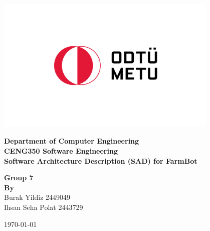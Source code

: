\begin{titlepage}
   \begin{center}

       \includegraphics[width=0.8\textwidth]{Figures/metu_logo.png}
       \vspace{0.0cm}
     
            
        \textbf{\LARGE Department of  Computer Engineering} \\
        \vspace{0.5cm}
        \textbf{\LARGE CENG350 Software Engineering}\\
        \vspace{0.5cm} 
        \textbf{\LARGE Software Architecture Description (SAD) for FarmBot} \\
        \vspace{1.5cm} 
 

        \textbf{Group 7}\\
       \textbf{\textbf{By}} \\Burak Yildiz 2449049 \\ Ihsan Seha Polat 2443729 \\ 
       

       \vspace{1.5cm}
            
    
\vspace{0.5cm}
            


\today            
   \end{center}
\end{titlepage}
